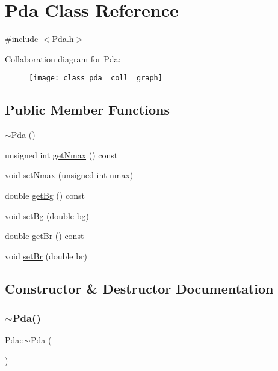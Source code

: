\hypertarget{class_pda}{}\section{Pda Class Reference}
\label{class_pda}


{\ttfamily \#include $<$Pda.\+h$>$}



Collaboration diagram for Pda\+:
\nopagebreak
\begin{figure}[H]
\begin{center}
\leavevmode
\texttt{[image: class\_pda\_\_coll\_\_graph]}
\end{center}
\end{figure}
\subsection*{Public Member Functions}
\begin{DoxyCompactItemize}
\item 
\hyperlink{class_pda_a9c72f6be70a8718284328f735b79374c}{$\sim$\+Pda} ()
\item 
unsigned int \hyperlink{class_pda_aca50144f22170263ef05997e5eefeff6}{get\+Nmax} () const
\item 
void \hyperlink{class_pda_a76f55e8d719aaace0f26ed1b47ed0bb4}{set\+Nmax} (unsigned int nmax)
\item 
double \hyperlink{class_pda_a769d8bdf3a739d421e226e126aae2d42}{get\+Bg} () const
\item 
void \hyperlink{class_pda_a64baea621f7aef17b43ee65b2a0c0aff}{set\+Bg} (double bg)
\item 
double \hyperlink{class_pda_adc2d16391e665139ea51a3489e7d8e3c}{get\+Br} () const
\item 
void \hyperlink{class_pda_a8890b9df42265440d7ce534bb8a95887}{set\+Br} (double br)
\end{DoxyCompactItemize}


\subsection{Constructor \& Destructor Documentation}
\mbox{\label{class_pda_a9c72f6be70a8718284328f735b79374c}} 
\subsubsection{\texorpdfstring{$\sim$\+Pda()}{~Pda()}}
{\footnotesize\ttfamily Pda\+::$\sim$\+Pda (\begin{DoxyParamCaption}{ }\end{DoxyParamCaption})\hspace{0.3cm}{\ttfamily [inline]}}



